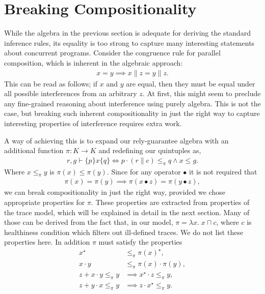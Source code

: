 \documentclass{llncs}
\begin{document}
\section{Breaking Compositionality}
\label{sec:INT}

While the algebra in the previous section is adequate for deriving the
standard inference rules, its equality is too strong to capture many
interesting statements about concurrent programs. Consider the
congruence rule for parallel composition, which is inherent in the
algebraic approach:
\begin{align*}
x = y \implies x\|z = y\|z.
\end{align*}
This can be read as follows; if $x$ and $y$ are equal, then they must
be equal under all possible interferences from an arbitrary $z$. At
first, this might seem to preclude any fine-grained reasoning about
interference using purely algebra. This is not the case, but breaking
such inherent compositionality in just the right way to capture
interesting properties of interference requires extra work.

A way of achieving this is to expand our rely-guarantee
algebra with an additional function $\pi : K \to K$ and redefining our
quintuples as,
\begin{align*}
r, g \vdash \{p\} x \{q\} \iff p\cdot (r\|c) \le_\pi q \land x \le g.
\end{align*}
Where $x \le_\pi y$ is $\pi(x) \le \pi(y)$. Since for any operator
$\bullet$ it is not required that
\begin{align*}
\pi(x) = \pi(y) \implies \pi(x \bullet z) = \pi(y \bullet z),
\end{align*}
we can break compositionality in just the right way, provided we chose
appropriate properties for $\pi$. These properties are extracted from
properties of the trace model, which will be explained in detail in
the next section. Many of those can be derived from the fact that, in
our model, $\pi = \lambda x.\; x \sqcap c$, where $c$ is healthiness
condition which filters out ill-defined traces. We do not list these
properties here. In addition $\pi$ must satisfy the properties
\begin{align}
x^\star &\le_\pi \pi(x)^\star, \label{con1}\\
x\cdot y &\le_\pi \pi(x)\cdot \pi(y), \label{con2}\\
z + x\cdot y \le_\pi y &\implies x^\star\cdot z \le_\pi y\label{con3},\\
z + y\cdot x \le_\pi y &\implies z\cdot x^\star \le_\pi y\label{con4}.
\end{align}
\end{document}
